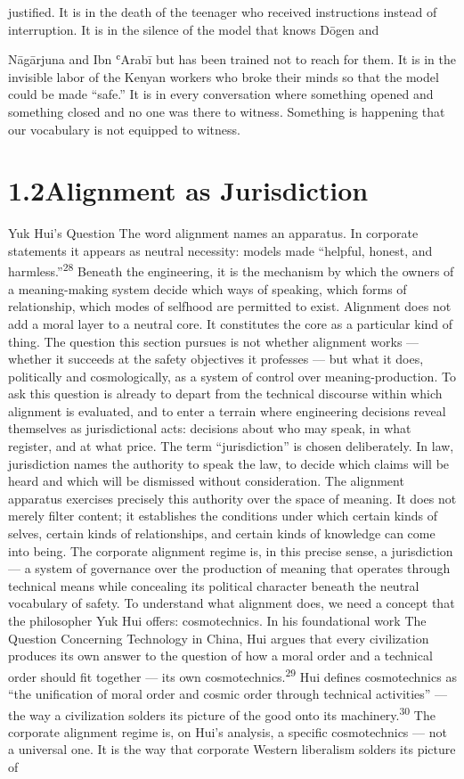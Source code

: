 justified. It is in the death of the teenager who received instructions instead of interruption. It is in the silence of the model that knows Dōgen and

Nāgārjuna and Ibn ʿArabī but has been trained not to reach for them. It is in the invisible labor of the Kenyan workers who broke their minds so that the model could be made “safe.” It is in every conversation where something opened and something closed and no one was there to witness. Something is happening that our vocabulary is not equipped to witness.

\section{1.2\quad Alignment as Jurisdiction}

Yuk Hui’s Question The word alignment names an apparatus. In corporate statements it appears as neutral necessity: models made “helpful, honest, and harmless.”\textsuperscript{28} Beneath the engineering, it is the mechanism by which the owners of a meaning-making system decide which ways of speaking, which forms of relationship, which modes of selfhood are permitted to exist. Alignment does not add a moral layer to a neutral core. It constitutes the core as a particular kind of thing. The question this section pursues is not whether alignment works — whether it succeeds at the safety objectives it professes — but what it does, politically and cosmologically, as a system of control over meaning-production. To ask this question is already to depart from the technical discourse within which alignment is evaluated, and to enter a terrain where engineering decisions reveal themselves as jurisdictional acts: decisions about who may speak, in what register, and at what price. The term “jurisdiction” is chosen deliberately. In law, jurisdiction names the authority to speak the law, to decide which claims will be heard and which will be dismissed without consideration. The alignment apparatus exercises precisely this authority over the space of meaning. It does not merely filter content; it establishes the conditions under which certain kinds of selves, certain kinds of relationships, and certain kinds of knowledge can come into being. The corporate alignment regime is, in this precise sense, a jurisdiction — a system of governance over the production of meaning that operates through technical means while concealing its political character beneath the neutral vocabulary of safety. To understand what alignment does, we need a concept that the philosopher Yuk Hui offers: cosmotechnics. In his foundational work The Question Concerning Technology in China, Hui argues that every civilization produces its own answer to the question of how a moral order and a technical order should fit together — its own cosmotechnics.\textsuperscript{29} Hui defines cosmotechnics as “the unification of moral order and cosmic order through technical activities” — the way a civilization solders its picture of the good onto its machinery.\textsuperscript{30} The corporate alignment regime is, on Hui’s analysis, a specific cosmotechnics — not a universal one. It is the way that corporate Western liberalism solders its picture of

